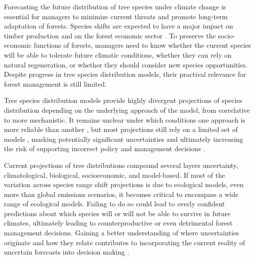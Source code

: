 \documentclass[11pt,letter]{article}
\begin{document}
Forecasting the future distribution of tree species under climate change is essential for managers to minimize current threats and promote long-term adaptation of forests. 
Species shifts are expected to have a major impact on timber production and on the forest economic sector \citep{Wessely2024, Hanewinkel2013}. To preserve the socio-economic functions of forests, managers need to know whether the current species will be able to tolerate future climatic conditions, whether they can rely on natural regeneration, or whether they should consider new species opportunities. %
Despite progress in tree species distribution models, their practival relevance for forest management is still limited.

Tree species distribution models provide highly divergent projections of species distribution \citep{Morin2009, Keenan2011a, Cheaib2012, Takolander2019} depending on the underlying approach of the model, from correlative to more mechanistic. It remains unclear under which conditions one approach is more reliable than another \citep{VanderMeersch2025}, but most projections still rely on a limited set of models \citep{Dyderski2018, Wessely2024, Hanewinkel2013, Schueler2014}, masking potentially significant uncertainties and ultimately increasing the risk of supporting incorrect policy and management decisions \citep{Dawson2011}. 

Current projections of tree distributions compound several layers uncertainty, climatological, biological, socioeconomic, and model-based. If most of the variation across species range shift projections is due to ecological models, even more than global emissions scenarios, it becomes critical to encompass a wide range of ecological models. Failing to do so could lead to overly confident predictions about which species will or will not be able to survive in future climates, ultimately leading to counterproductive or even detrimental forest management decisions. Gaining a better understanding of where uncertainties originate and how they relate contributes to  incorporating the current reality of uncertain forecasts into decision making \citep{Urban2016, Saltelli2020, Johnson2024, Simmonds2024}. %
\end{document}
